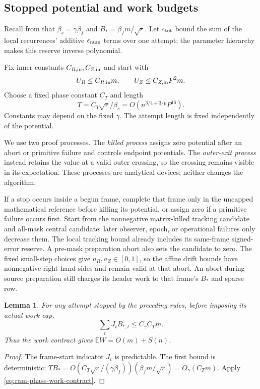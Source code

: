 \documentclass[11pt]{article}
\newtheorem{lemma}[theorem]{Lemma}
\theoremstyle{remark}
\newcommand{\Ex}{\mathbb E}
\renewcommand{\O}{\ddot{O}}
\begin{document}
\subsection{Stopped potential and work budgets}

Recall from  that $\beta_s=\gamma\beta_f$ and
$B_*=\beta_fm/\sqrt r$.
Let $\epsilon_{\rm tot}$ bound the sum of the local recurrences' additive
$\epsilon_{\rm num}$ terms over one attempt; the parameter hierarchy makes this
reserve inverse polynomial.

Fix inner constants $C_{R,\rm in},C_{Z,\rm in}$ and start with
\[
 U_R\le C_{R,\rm in}m,
 \qquad U_Z\le C_{Z,\rm in}P^2m.
\]
Choose a fixed phase constant $C_T$ and length
\[
 T=C_T\sqrt r/\beta_s
   =O\left(n^{3/4+3/p}P^{16}\right).
\]
Constants may depend on the fixed $\gamma$.
The attempt length is fixed independently of the potential.

We use two proof processes.
The \emph{killed process} assigns zero potential after an abort or primitive
failure and controls endpoint potentials.
The \emph{outer-exit process} instead retains the value at a valid outer
crossing, so the crossing remains visible in its expectation.
These processes are analytical devices; neither changes the algorithm.

If a stop occurs inside a begun frame, complete that frame only in the uncapped
mathematical reference before killing its potential, or assign zero if a
primitive failure occurs first.
Start from the nonnegative matrix-killed tracking candidate and all-mask central
candidate; later observer, epoch, or operational failures only decrease them.
The local tracking bound already includes its same-frame signed-error reserve.
A pre-mask preparation abort also sets the candidate to zero.
The fixed small-step choices give $a_R,a_Z\in[0,1]$, so the affine drift bounds
have nonnegative right-hand sides and remain valid at that abort.
An abort during source preparation still charges its header work to that frame's
$B_*$ and sparse row.

\begin{lemma}
\label{lem:ram-attempt-budgets}
For any attempt stopped by the preceding rules, before imposing its actual-work
cap,
\[
 \sum_tJ_t B_{*,t}\le C_\gamma C_Tm.
\]
Thus the work contract gives $\Ex W=\O(m)+S(n)$.
\end{lemma} \begin{proof} The frame-start indicator $J_t$ is predictable.
The first bound is deterministic: $TB_*=O(C_T\sqrt r/(\gamma\beta_f))
(\beta_fm/\sqrt r)=O_\gamma(C_Tm)$.
Apply \eqref{eq:ram-phase-work-contract}.
\end{proof}
\end{document}
